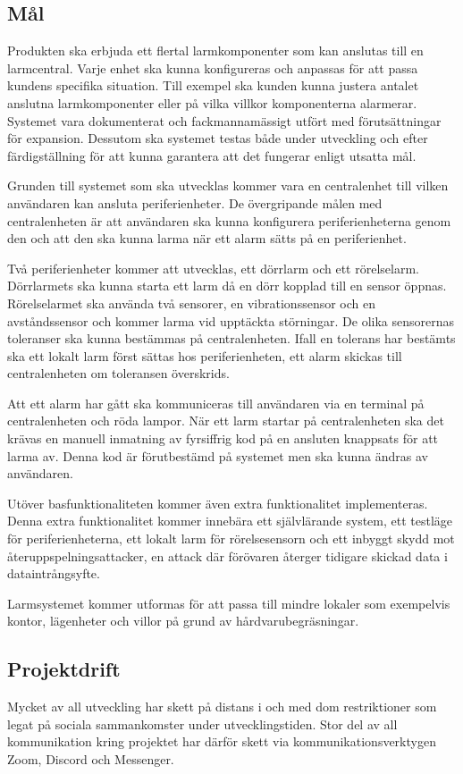 \documentclass[a4paper]{article}
\begin{document}
\subsection{Mål}

Produkten ska erbjuda ett flertal larmkomponenter som kan anslutas till en larmcentral.
Varje enhet ska kunna konfigureras och anpassas för att passa kundens specifika situation.
Till exempel ska kunden kunna justera antalet anslutna larmkomponenter eller på vilka villkor komponenterna alarmerar.
Systemet vara dokumenterat och fackmannamässigt utfört med förutsättningar för expansion.
Dessutom ska systemet testas både under utveckling och efter färdigställning för att kunna garantera att det fungerar enligt utsatta mål.

Grunden till systemet som ska utvecklas kommer vara en centralenhet till vilken användaren kan ansluta periferienheter. De övergripande målen med centralenheten är att användaren ska kunna konfigurera periferienheterna genom den och att den ska kunna larma när ett alarm sätts på en periferienhet.

Två periferienheter kommer att utvecklas, ett dörrlarm och ett rörelselarm.
Dörrlarmets ska kunna starta ett larm då en dörr kopplad till en sensor öppnas.
Rörelselarmet ska använda två sensorer, en vibrationssensor och en avståndssensor och kommer larma vid upptäckta störningar.
De olika sensorernas toleranser ska kunna bestämmas på centralenheten.
Ifall en tolerans har bestämts ska ett lokalt larm först sättas hos periferienheten, ett alarm skickas till centralenheten om toleransen överskrids.

Att ett alarm har gått ska kommuniceras till användaren via en terminal på centralenheten och röda lampor.
När ett larm startar på centralenheten ska det krävas en manuell inmatning av fyrsiffrig kod på en ansluten knappsats för att larma av.
Denna kod är förutbestämd på systemet men ska kunna ändras av användaren.

Utöver basfunktionaliteten kommer även extra funktionalitet implementeras.
Denna extra funktionalitet kommer innebära ett självlärande system, ett testläge för periferienheterna, ett lokalt larm för rörelsesensorn och ett inbyggt skydd mot återuppspelningsattacker, en attack där förövaren återger tidigare skickad data i dataintrångsyfte.

Larmsystemet kommer utformas för att passa till mindre lokaler som exempelvis kontor, lägenheter och villor på grund av hårdvarubegräsningar.

\subsection{Projektdrift}
Mycket av all utveckling har skett på distans i och med dom restriktioner som legat på sociala sammankomster under utvecklingstiden.
Stor del av all kommunikation kring projektet har därför skett via kommunikationsverktygen Zoom, Discord och Messenger.
\end{document}
